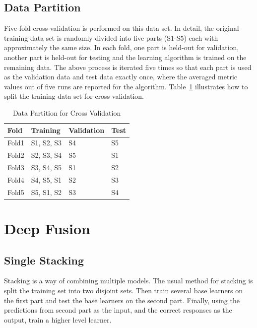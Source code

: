 \documentclass[12pt]{article}
\begin{document}
\subsection{Data Partition}

Five-fold cross-validation is performed on this data set. In detail, the original training data set is randomly divided into five parts (S1-S5) each with approximately the same size. In each fold, one part is held-out for validation, another part is held-out for testing and the learning algorithm is trained on the remaining data. The above process is iterated five times so that each part is used as the validation data and test data exactly once, where the averaged metric values out of five runs are reported for the algorithm. Table~{\ref{tab:data-part-cv}} illustrates how to split the training data set for cross validation.

\begin{table}[ht]
\centering
\caption{Data Partition for Cross Validation}
    \label{tab:data-part-cv}
\begin{tabular}{p{3cm}p{3cm}p{3cm}p{3cm}}
\hline
 Fold & Training	& Validation        & Test \\
\hline\hline
Fold1 & S1, S2, S3 & S4 & S5 \\ \hline
Fold2	&	S2, S3, S4	&	S5	&		S1 \\ \hline	
Fold3	&	S3, S4, S5	&	S1	&		S2	\\ \hline
Fold4	&	S4, S5, S1	&	S2	&		S3	\\ \hline
Fold5	&	S5, S1, S2	&	S3	&		S4 \\ \hline
\end{tabular}
\end{table}

\section{Deep Fusion}

\subsection{Single Stacking}
\label{chap:single-stacking}

Stacking is a way of combining multiple models. The usual method for stacking is split the training set into two disjoint sets. Then train several base learners on the first part and test the base learners on the second part. Finally, using the predictions from second part as the input, and the correct responses as the output, train a higher level learner.
\end{document}
